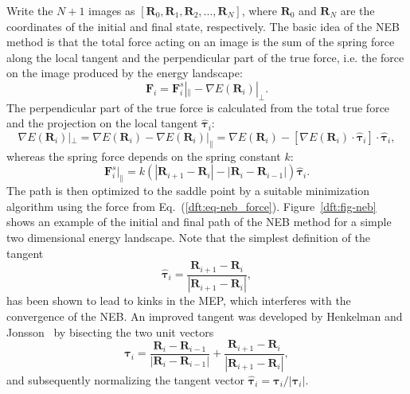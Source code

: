 \begin{refsection}
Write the $N + 1$ images as $\left[ \mathbf{R}_0,  \mathbf{R}_1,  
\mathbf{R}_2, ...,  \mathbf{R}_N  \right]$, where $ \mathbf{R}_0$ and $ 
\mathbf{R}_N$ are the coordinates of the initial and final state, respectively. The basic idea of 
the NEB method is that the total force acting on an image is the sum of the 
spring force along the local tangent and the perpendicular part of the true 
force, i.e. the force on the image produced by the energy landscape: 
\begin{equation}\label{dft:eq-neb_force} 
\mathbf{F}_i = \mathbf{F}_i^s|_\parallel - \nabla E(\mathbf{R}_i)|_\perp.
\end{equation} 
The perpendicular part of the true force is calculated from the total true force and the 
projection on the local tangent $\boldsymbol{\hat{\tau}}_i$: 
\begin{equation} 
\nabla E(\mathbf{R}_i)|_\perp = \nabla E(\mathbf{R}_i) - \nabla 
E(\mathbf{R}_i)|_\parallel = \nabla E(\mathbf{R}_i) - \left[ \nabla 
E(\mathbf{R}_i) \cdot \boldsymbol{\hat{\tau}}_i \right] \cdot \boldsymbol{\hat{\tau}}_i, 
\end{equation} 
whereas the spring force depends on the spring constant $k$: 
\begin{equation}\label{dft:eq-neb_spring} 
\mathbf{F}_i^s|_\parallel = k\left( |\mathbf{R}_{i+1} - \mathbf{R}_i | - 
|\mathbf{R}_i - \mathbf{R}_{i-1} | \right) \boldsymbol{\hat{\tau}}_i.
\end{equation}
The path is then optimized to the saddle point by a suitable minimization 
algorithm using the force from Eq.~(\ref{dft:eq-neb_force}). Figure~\ref{dft:fig-neb} 
shows an example of the initial and final path of the NEB method for a simple 
two dimensional energy landscape. Note that the simplest definition of the
tangent
\begin{equation}
\boldsymbol{\hat{\tau}}_i = \frac{\mathbf{R}_{i+1} - \mathbf{R}_i}{|\mathbf{R}_{i+1} - \mathbf{R}_i |},
\end{equation}
has been shown to lead to kinks in the MEP, which interferes with the 
convergence of the NEB. An improved tangent was developed by 
Henkelman and Jonsson~\cite{Henkelman2000} by bisecting the two unit vectors 
\begin{equation}
\boldsymbol{\tau}_i = \frac{\mathbf{R}_i - \mathbf{R}_{i-1}}{|\mathbf{R}_i - \mathbf{R}_{i-1} |} + \frac{\mathbf{R}_{i+1} - \mathbf{R}_i}{|\mathbf{R}_{i+1} - \mathbf{R}_i |},
\end{equation}
and subsequently normalizing the tangent vector $\boldsymbol{\hat{\tau}}_i = \boldsymbol{\tau}_i / |\boldsymbol{\tau}_i |$.


\end{refsection}

